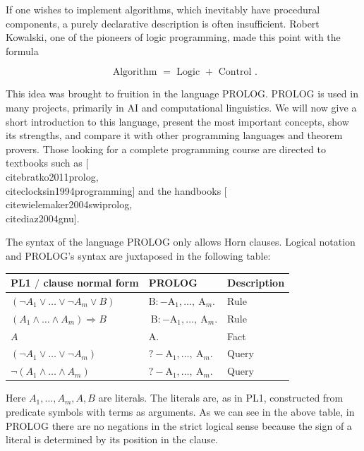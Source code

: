 \documentclass[10pt]{book}
\begin{document}
If one wishes to implement algorithms, which inevitably have procedural components, a purely declarative description is often insufficient. Robert Kowalski, one of the pioneers of logic programming, made this point with the formula

$$
\text { Algorithm }=\text { Logic }+ \text { Control } .
$$

This idea was brought to fruition in the language PROLOG. PROLOG is used in many projects, primarily in AI and computational linguistics. We will now give a short introduction to this language, present the most important concepts, show its strengths, and compare it with other programming languages and theorem provers. Those looking for a complete programming course are directed to textbooks such as [\\cite{bratko2011prolog}, \\cite{clocksin1994programming}] and the handbooks [\\cite{wielemaker2004swiprolog}, \\cite{diaz2004gnu}].

The syntax of the language PROLOG only allows Horn clauses. Logical notation and PROLOG's syntax are juxtaposed in the following table:

\begin{center}
\begin{tabular}{lll}
\hline
PL1 $/$ clause normal form & PROLOG & Description \\
\hline
$\left(\neg A_{1} \vee \ldots \vee \neg A_{m} \vee B\right)$ & $\mathrm{B}:-\mathrm{A}_{1}, \ldots, \mathrm{~A}_{m}$. & Rule \\
\hline
$\left(A_{1} \wedge \ldots \wedge A_{m}\right) \Rightarrow B$ & $\mathrm{~B}:-\mathrm{A}_{1}, \ldots, \mathrm{~A}_{m}$. & Rule \\
\hline
$A$ & A. & Fact \\
\hline
$\left(\neg A_{1} \vee \ldots \vee \neg A_{m}\right)$ & $?-\mathrm{A}_{1}, \ldots, \mathrm{~A}_{m}$. & Query \\
\hline
$\neg\left(A_{1} \wedge \ldots \wedge A_{m}\right)$ & $?-\mathrm{A}_{1}, \ldots, \mathrm{~A}_{m}$. & Query \\
\hline
\end{tabular}
\end{center}

Here $A_{1}, \ldots, A_{m}, A, B$ are literals. The literals are, as in PL1, constructed from predicate symbols with terms as arguments. As we can see in the above table, in PROLOG there are no negations in the strict logical sense because the sign of a literal is determined by its position in the clause.
\end{document}

